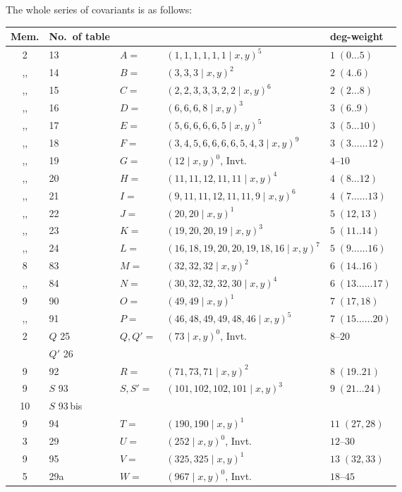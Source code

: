 \documentclass[11pt]{article}
\begin{document}
The whole series of covariants is as follows:

\medskip
\begin{center}
\begin{tabular}{cllll}
Mem. & No.\ of table & & & deg-weight \\
\hline
2 & 13 & $A =$ & $(1, 1, 1, 1, 1, 1 \mid x, y)^5$ & $1\;(0\ldots 5)$ \\
,, & 14 & $B =$ & $(3, 3, 3 \mid x, y)^2$ & $2\;(4..6)$ \\
,, & 15 & $C =$ & $(2, 2, 3, 3, 3, 2, 2 \mid x, y)^6$ & $2\;(2\ldots 8)$ \\
,, & 16 & $D =$ & $(6, 6, 6, 8 \mid x, y)^3$ & $3\;(6..9)$ \\
,, & 17 & $E =$ & $(5, 6, 6, 6, 6, 5 \mid x, y)^5$ & $3\;(5\ldots 10)$ \\
,, & 18 & $F =$ & $(3, 4, 5, 6, 6, 6, 6, 5, 4, 3 \mid x, y)^9$ & $3\;(3\ldots\ldots 12)$ \\
,, & 19 & $G =$ & $(12 \mid x, y)^0$, Invt. & $4$--$10$ \\
,, & 20 & $H =$ & $(11, 11, 12, 11, 11 \mid x, y)^4$ & $4\;(8\ldots 12)$ \\
,, & 21 & $I =$ & $(9, 11, 11, 12, 11, 11, 9 \mid x, y)^6$ & $4\;(7\ldots\ldots 13)$ \\
,, & 22 & $J =$ & $(20, 20 \mid x, y)^1$ & $5\;(12, 13)$ \\
,, & 23 & $K =$ & $(19, 20, 20, 19 \mid x, y)^3$ & $5\;(11..14)$ \\
,, & 24 & $L =$ & $(16, 18, 19, 20, 20, 19, 18, 16 \mid x, y)^7$ & $5\;(9\ldots\ldots 16)$ \\
8 & 83 & $M =$ & $(32, 32, 32 \mid x, y)^2$ & $6\;(14..16)$ \\
,, & 84 & $N =$ & $(30, 32, 32, 32, 30 \mid x, y)^4$ & $6\;(13\ldots\ldots 17)$ \\
9 & 90 & $O =$ & $(49, 49 \mid x, y)^1$ & $7\;(17, 18)$ \\
,, & 91 & $P =$ & $(46, 48, 49, 49, 48, 46 \mid x, y)^5$ & $7\;(15\ldots\ldots 20)$ \\
2 & $Q$ 25 & $Q, Q' =$ & $(73 \mid x, y)^0$, Invt. & $8$--$20$ \\
  & $Q'$ 26 & & & \\
9 & 92 & $R =$ & $(71, 73, 71 \mid x, y)^2$ & $8\;(19..21)$ \\
9 & $S$ 93 & $S, S' =$ & $(101, 102, 102, 101 \mid x, y)^3$ & $9\;(21\ldots 24)$ \\
10 & $S$ 93\,bis & & & \\
9 & 94 & $T =$ & $(190, 190 \mid x, y)^1$ & $11\;(27, 28)$ \\
3 & 29 & $U =$ & $(252 \mid x, y)^0$, Invt. & $12$--$30$ \\
9 & 95 & $V =$ & $(325, 325 \mid x, y)^1$ & $13\;(32, 33)$ \\
5 & 29a & $W =$ & $(967 \mid x, y)^0$, Invt. & $18$--$45$
\end{tabular}
\end{center}
\end{document}
